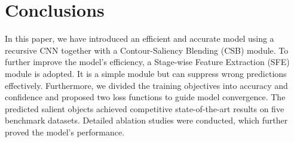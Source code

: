 \documentclass[10pt,twocolumn,letterpaper]{article}
\begin{document}
\section{Conclusions}
In this paper, we have introduced an efficient and accurate model using a recursive CNN together with a Contour-Saliency Blending (CSB) module. To further improve the model's efficiency, a Stage-wise Feature Extraction (SFE) module is adopted. It is a simple module but can suppress wrong predictions effectively. Furthermore, we divided the training objectives into accuracy and confidence and proposed two loss functions to guide model convergence. The predicted salient objects achieved competitive state-of-the-art results on five benchmark datasets. Detailed ablation studies were conducted, which further proved the model's performance.



{\small


}
\end{document}
